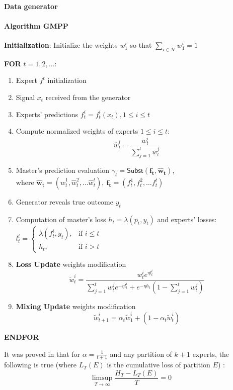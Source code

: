 \documentclass[12pt, twoside]{article}
\begin{document}
\paragraph{Data generator}
 
\paragraph{Algorithm GMPP}
\textbf{Initialization}: Initialize the weights $w^i_1$ so that $\sum_{i \in \mathcal{N}}w^i_1 = 1$

\textbf{FOR} $t = 1, 2, \dots$:
\begin{enumerate}[leftmargin=4em]
\item Expert $f^t$ initialization
\item Signal $x_t$ received from the generator 
\item Experts' predictions $f_t^i = f_t^i(x_t), 1 \le i \le t$ 
\item Compute normalized weights of experts  $1 \le i \le t$: $$\widehat{w}^i_t = \dfrac{w^i_t}{\sum_{j=1}^t w_t^j}$$
\item Master's prediction evaluation $\gamma_t = \mathsf{Subst}(\mathbf{f_t}, \mathbf{\widehat{w}_t})$, \\ where $\mathbf{\widehat{w}_t} = (\widehat{w}_t^1, \widehat{w}_t^2, \dots \widehat{w}_t^t),\ \mathbf{f_t} = (f_t^1, f_t^2, \dots f_t^t)$
\item Generator reveals true outcome $y_t$
\item Computation of master's loss $h_t = \lambda(p_t, y_t) $ and experts' losses: $l_t^i =
\begin{cases}
        \lambda(f_t^i, y_t), & \text{if $i \le t$} \\
        h_t, & \text{if $i > t$}
\end{cases}$

\item \textbf{Loss Update} weights modification
\[  \widetilde{w}_t^i = \dfrac{w_t^i e^{\eta l_t^i}}{\sum\limits_{j = 1}^t w_t^j e^{-\eta l_t^i} + e^{-\eta h_t} (1 - \sum\limits_{j = 1}^t w_t^j) } \]
\item \textbf{Mixing Update} weights modification
\[  \widetilde{w}_{t+1}^i = \alpha_t\widetilde{w}_1^i + (1 - \alpha_t\widetilde{w}_t^i)\] 
\end{enumerate}

\textbf{ENDFOR}

\bigskip
It was proved in \cite{article} that for $\alpha = \frac1{t + 1}$ and any partition of $k+1$ experts, the following is true  (where $L_T(E)$ is the cumulative loss of partition $E$) :
\[ \limsup_{T \to \infty} \dfrac{H_T - L_T(E)}{T} = 0\] 
\end{document}
